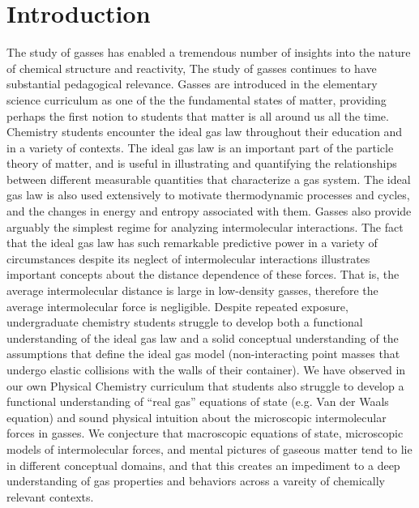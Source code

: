 \documentclass[journal=jpclcd,manuscript=article]{achemso}
\begin{document}
\begin{abstract}
\end{abstract}



\section{Introduction}
The study of gasses has enabled a tremendous number of insights into the nature of chemical 
structure and reactivity, %
The study of gasses continues
to have substantial pedagogical relevance.  Gasses are introduced in the elementary science curriculum as one of the 
the fundamental states of matter, providing perhaps the first notion to students that matter is all around us all the time.   %
Chemistry students encounter the ideal gas law throughout their education and in a variety of contexts.  
The ideal gas law is an important part of the particle theory of matter, and is useful in illustrating and quantifying
the relationships between different measurable quantities that characterize a gas system.  The ideal gas law is also 
used extensively to motivate thermodynamic processes and cycles, and the changes in energy and entropy associated with them.  
Gasses also provide arguably the simplest regime for analyzing intermolecular interactions.  The fact that the ideal gas law
has such remarkable predictive power in a variety of circumstances despite its neglect of intermolecular interactions illustrates
important concepts about the distance dependence of these forces.  That is, the average intermolecular distance is large in 
low-density gasses, therefore the average intermolecular force is negligible.  Despite repeated exposure,
undergraduate chemistry students struggle to develop both a functional understanding of the 
ideal gas law%
and a solid conceptual understanding of the assumptions that define the ideal gas model (non-interacting point masses 
that undergo elastic collisions with the walls of their container).  We have observed in our own Physical Chemistry curriculum 
that students also struggle to develop a functional
understanding of ``real gas'' equations of state (e.g. Van der Waals equation) and sound
physical intuition about the microscopic intermolecular forces in gasses.  We conjecture that macroscopic equations of state,
microscopic models of intermolecular forces, and mental pictures of gaseous matter tend to lie in different conceptual domains, and
that this creates an impediment to a deep understanding of gas properties and behaviors across a vareity of chemically relevant contexts.
\end{document}
